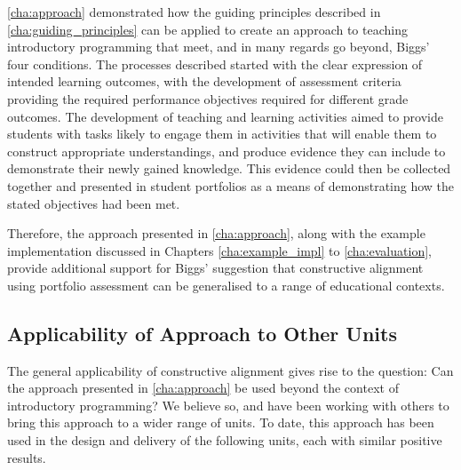\cref{cha:approach} demonstrated how the guiding principles described in \cref{cha:guiding_principles} can be applied to create an approach to teaching introductory programming that meet, and in many regards go beyond, Biggs' four conditions. The processes described started with the clear expression of intended learning outcomes, with the development of assessment criteria providing the required performance objectives required for different grade outcomes. The development of teaching and learning activities aimed to provide students with tasks likely to engage them in activities that will enable them to construct appropriate understandings, and produce evidence they can include to demonstrate their newly gained knowledge. This evidence could then be collected together and presented in student portfolios as a means of demonstrating how the stated objectives had been met.

Therefore, the approach presented in \cref{cha:approach}, along with the example implementation discussed in Chapters \ref{cha:example_impl} to \ref{cha:evaluation}, provide additional support for Biggs' suggestion that constructive alignment using portfolio assessment can be generalised to a range of educational contexts.

\subsection{Applicability of Approach to Other Units} %
 \label{sub:applicability_of_approach_to_other_units}
 

The general applicability of constructive alignment gives rise to the question: Can the approach presented in \cref{cha:approach} be used beyond the context of introductory programming? We believe so, and have been working with others to bring this approach to a wider range of units. To date, this approach has been used in the design and delivery of the following units, each with similar positive results.

